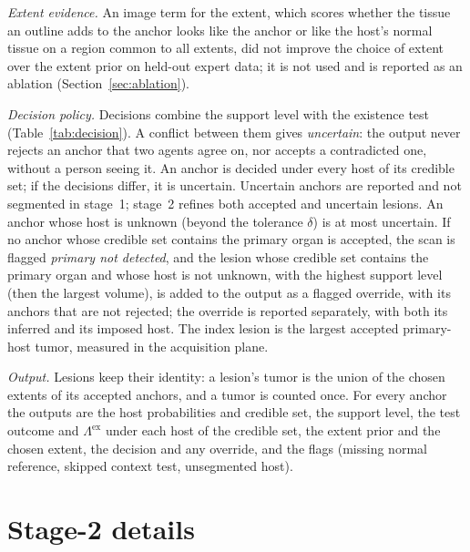 \documentclass[fleqn,10pt]{olplainarticle}
\begin{document}
\emph{Extent evidence.} An image term for the extent, which scores whether the tissue an outline adds to the anchor
looks like the anchor or like the host's normal tissue on a region common to all extents, did not improve the choice of
extent over the extent prior on held-out expert data; it is not used and is reported as an ablation
(Section~\ref{sec:ablation}).

\emph{Decision policy.} Decisions combine the support level with the existence test (Table~\ref{tab:decision}). A
conflict between them gives \emph{uncertain}: the output never rejects an anchor that two agents agree on, nor accepts a
contradicted one, without a person seeing it. An anchor is decided under every host of its credible set; if the decisions
differ, it is uncertain. Uncertain anchors are reported and not segmented in stage~1; stage~2 refines both accepted and uncertain lesions. An
anchor whose host is unknown (beyond the tolerance $\delta$) is at most uncertain. If no anchor whose credible set
contains the primary organ is accepted, the scan is flagged \emph{primary not detected}, and the lesion whose credible set
contains the primary organ and whose host is not unknown, with the highest support level (then the largest volume), is added to the output as a flagged
override, with its anchors that are not rejected; the override is reported separately, with both its inferred and its
imposed host. The index lesion is the largest accepted primary-host tumor, measured in the acquisition plane.

\emph{Output.} Lesions keep their identity: a lesion's tumor is the union of the chosen extents of its accepted anchors, and a
tumor is counted once. For every anchor the outputs are the host probabilities and credible set, the support level, the
test outcome and $\Lambda^{\mathrm{ex}}$ under each host of the credible set, the extent prior and the chosen extent, the
decision and any override, and the flags (missing normal reference, skipped context test, unsegmented host).

\section{Stage-2 details}
\label{sec:stage2_details}
\end{document}
